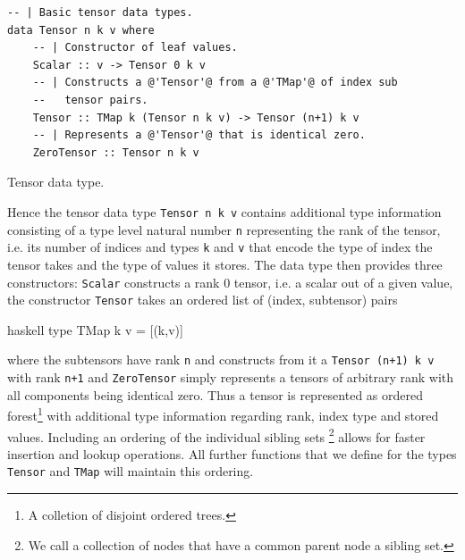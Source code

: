 \documentclass[a4paper,12pt, DIV=14, BCOR=5mm, twoside, headsepline, numbers=noenddot]{scrbook}
\begin{document}
\begin{listing}[hbt!]
\begin{verbatim}
-- | Basic tensor data types.
data Tensor n k v where
    -- | Constructor of leaf values.
    Scalar :: v -> Tensor 0 k v
    -- | Constructs a @'Tensor'@ from a @'TMap'@ of index sub
    --   tensor pairs.
    Tensor :: TMap k (Tensor n k v) -> Tensor (n+1) k v
    -- | Represents a @'Tensor'@ that is identical zero.
    ZeroTensor :: Tensor n k v
\end{verbatim} 
\caption{Tensor data type.}\label{TensorDat}
\end{listing}

Hence the tensor data type \texttt{Tensor n k v} contains additional type information consisting of a type level natural number \texttt{n} representing the rank of the tensor, i.e. its number of indices and types \texttt{k} and \texttt{v} that encode the type of index the tensor takes and the type of values it stores. The data type then provides three constructors: \texttt{Scalar} constructs a rank 0 tensor, i.e. a scalar out of a given value, the constructor \texttt{Tensor} takes an ordered list of (index, subtensor) pairs
\begin{center}
\begin{cminted}{haskell}
type TMap k v = [(k,v)]
\end{cminted}
\end{center}
where the subtensors have rank \texttt{n} and constructs from it a \texttt{Tensor (n+1) k v} with rank \texttt{n+1} and \texttt{ZeroTensor} simply represents a tensors of arbitrary rank with all components being identical zero. Thus a tensor is represented as ordered forest\footnote{A colletion of disjoint ordered trees.} with additional type information regarding rank, index type and stored values. Including an ordering of the individual sibling sets \footnote{We call a collection of nodes that have a common parent node a sibling set.} allows for faster insertion and lookup operations. All further functions that we define for the types \texttt{Tensor} and \texttt{TMap} will maintain this ordering.
\end{document}
